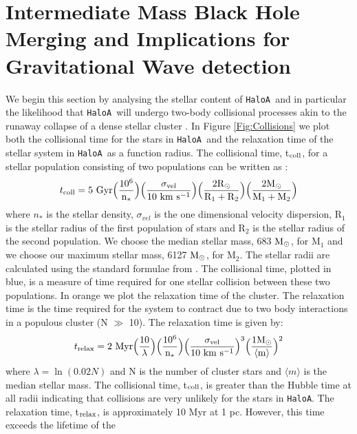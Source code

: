\documentclass[twocolumn,iop,revtex4]{openjournal}
\newcommand{\msolarc} {$\rm{M_{\odot}}$}
\newcommand{\ha} {\texttt{HaloA~}}
\newcommand{\hac} {\texttt{HaloA}}
\begin{document}
\section{Intermediate Mass Black Hole Merging and Implications for Gravitational Wave detection} \label{Sec:GW}
We begin this section by analysing the stellar content of \ha and in particular the likelihood
that \ha will undergo two-body collisional processes akin to the runaway collapse of a dense stellar
cluster \citep{PortegiesZwart_2004, Gurkan_2004, Freitag_2006, Regan_2009b, Katz_2015}. In Figure
\ref{Fig:Collisions} we plot both the collisional time for the stars in \ha and the relaxation
time of the stellar system in \ha as a
function radius. The collisional time, t$_{\rm{coll}}$, for a stellar population consisting of two
populations can be written as \citep{Freitag_2008}:
\begin{equation}
  t_{\rm{coll}} = 5 \ \rm{Gyr} \Big( {10^6 \over n_*} \Big ) \Big( {\sigma_{vel} \over 10 \ \rm{km \ s^{-1}}} \Big ) \Big ({2 R_{\odot} \over R_1 + R_2} \Big) \Big ({2 M_{\odot} \over M_1 + M_2} \Big)
\end{equation}
where $n_*$ is the stellar density, $\sigma_{vel}$ is the one dimensional velocity dispersion,
R$_1$ is the stellar radius of the first population of stars and R$_2$ is the stellar radius of the
second population. We choose the median stellar mass, 683 \msolarc, for M$_1$ and we choose our
maximum stellar mass, 6127 \msolarc, for M$_2$. The stellar radii are calculated using the standard
formulae from \cite{Stahler_1986}. The collisional time, plotted in blue, is a measure of time
required for one
stellar collision between these two populations. In orange we plot the relaxation time of the cluster.
The relaxation time is the time required for the system to contract due to two body interactions in a
populous cluster (N $\gg$ 10). The relaxation time is given by:
\begin{equation}
  t_{\rm{relax}} = 2 \ \rm{Myr} \Big ( {10 \over \lambda} \Big )  \Big( {10^6 \over n_*} \Big ) \Big( {\sigma_{vel} \over 10 \ \rm{km \ s^{-1}}} \Big )^3 \Big ( {1  M_{\odot} \over \langle m \rangle } \Big )^2
\end{equation}
where $\lambda = \ln (0.02 N)$ and  N is the number of cluster stars and $\langle m \rangle$
is the median stellar mass. The collisional time, t$_{\rm{coll}}$, is greater than the Hubble time
at all radii indicating that collisions are very unlikely for the stars in \hac. The relaxation time,
t$_{\rm{relax}}$, is approximately 10 Myr at 1 pc. However, this time exceeds the lifetime of the
\end{document}
